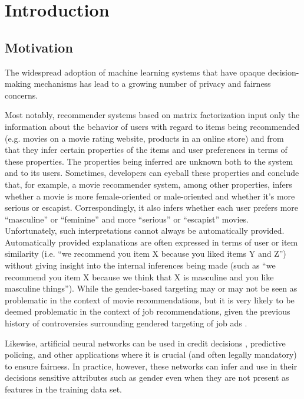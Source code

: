 \chapter{Introduction}

\section{Motivation}

The widespread adoption of machine learning systems that have opaque
decision-making mechanisms has lead to a growing number of privacy and fairness
concerns.

Most notably, recommender systems based on matrix factorization
input only the information about the behavior of users with regard to items
being recommended (e.g. movies on a movie rating website, products in an
online store) and from that they infer certain properties of the items and
user preferences in terms of these properties\cite{facebook-cf}. The properties
being inferred are unknown both to the system and to its users. Sometimes,
developers can eyeball these properties and conclude that, for example, a movie
recommender system, among other properties, infers whether a movie is more
female-oriented or male-oriented and whether it's more serious or escapist.
Correspondingly, it also infers whether each user prefers more ``masculine'' or
``feminine'' and more ``serious'' or ``escapist'' movies\cite{koren2009matrix}.
Unfortunately, such interpretations cannot always be automatically provided.
Automatically provided explanations are often expressed in terms of user or
item similarity (i.e. ``we recommend you item X because you liked items Y and
Z'') without giving insight into the internal inferences being made (such as
``we recommend you item X because we think that X is masculine and you like
masculine things''). While the gender-based targeting may or may not be seen as
problematic in the context of movie recommendations, but it is very likely to be
deemed problematic in the context of job recommendations, given the previous
history of controversies surrounding gendered targeting of job ads
\cite{datta_tschantz_datta_2015}.

Likewise, artificial neural networks can be used in credit decisions
\cite{WEST20001131}, predictive policing\cite{Seo2018PartiallyGN}, and other
applications where it is crucial (and often legally mandatory) to ensure
fairness. In practice, however, these networks can infer and use in their
decisions sensitive attributes such as gender even when they are not present
as features in the training data set\cite{Beutel2017DataDA}.

